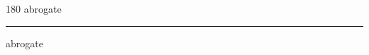 
\begin{frame}
\begin{center}
\begin{turn}{180}
{\fontsize{2.5cm}{1em}\selectfont abrogate}
\end{turn}
\vspace{1em}\par  
\hrule
\vspace{1em}\par  
{\fontsize{2.5cm}{1em}\selectfont abrogate}
\end{center}
\end{frame}
